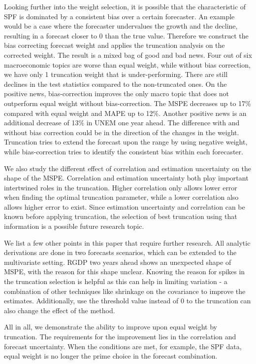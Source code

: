 \documentclass[11pt]{article}
\begin{document}
Looking further into the weight selection, it is possible that the characteristic of SPF is dominated by a consistent bias over a certain forecaster. An example would be a case where the forecaster undervalues the growth and the decline, resulting in a forecast closer to 0 than the true value. Therefore we construct the bias correcting forecast weight and applies the truncation analysis on the corrected weight. The result is a mixed bag of good and bad news. Four out of six macroeconomic topics are worse than equal weight, while without bias correction, we have only 1 truncation weight that is under-performing. There are still declines in the test statistics compared to the non-truncated ones. On the positive news, bias-correction improves the only macro topic that does not outperform equal weight without bias-correction. The MSPE decreases up to 17\% compared with equal weight and MAPE up to 12\%. Another positive news is an additional decrease of 13\% in UNEM one year ahead. The difference with and without bias correction could be in the direction of the changes in the weight. Truncation tries to extend the forecast upon the range by using negative weight, while bias-correction tries to identify the consistent bias within each forecaster.

We also study the different effect of correlation and estimation uncertainty on the shape of the MSPE. Correlation and estimation uncertainty both play important intertwined roles in the truncation. Higher correlation only allows lower error when finding the optimal truncation parameter, while a lower correlation also allows higher error to exist. Since estimation uncertainty and correlation can be known before applying truncation, the selection of best truncation using that information is a possible future research topic.

We list a few other points in this paper that require further research. All analytic derivations are done in two forecasts scenarios, which can be extended to the multivariate setting. RGDP two years ahead shows an unexpected shape of MSPE, with the reason for this shape unclear. Knowing the reason for spikes in the truncation selection is helpful as this can help in limiting variation - a combination of other techniques like shrinkage on the covariance to improve the estimates. Additionally, use the threshold value instead of 0 to the truncation can also change the effect of the method.

All in all, we demonstrate the ability to improve upon equal weight by truncation. The requirements for the improvement lies in the correlation and forecast uncertainty. When the conditions are met, for example, the SPF data, equal weight is no longer the prime choice in the forecast combination. 

\newpage



\end{document}

